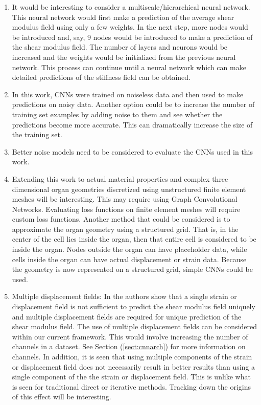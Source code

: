 \documentclass[12pt]{article}
\begin{document}
\begin{enumerate}
\item{It would be interesting to consider a multiscale/hierarchical neural network. This neural network would first make a prediction of the average shear modulus field using only a few weights. In the next step, more nodes would be introduced and, say, 9 nodes would be introduced to make a prediction of the shear modulus field. The number of layers and neurons would be increased and the weights would be initialized from the previous neural network. This process can continue until a neural network which can make detailed predictions of the stiffness field can be obtained.}
\item{In this work, CNNs were trained on noiseless data and then used to make predictions on noisy data. Another option could be to increase the number of training set examples by adding noise to them and see whether the predictions become more accurate. This can dramatically increase the size of the training set.}
\item{Better noise models need to be considered to evaluate the CNNs used in this work.}
\item{Extending this work to actual material properties and complex three dimensional organ geometries discretized using unstructured finite element meshes will be interesting. This may require using Graph Convolutional Networks. Evaluating loss functions on finite element meshes will require custom loss functions. Another method that could be considered is to approximate the organ geometry using a structured grid. That is, in the center of the cell lies inside the organ, then that entire cell is considered to be inside the organ. Nodes outside the organ can have placeholder data, while cells inside the organ can have actual displacement or strain data. Because the geometry is now represented on a structured grid, simple CNNs could be used.}
\item{Multiple displacement fields: In \cite{paper:barbonegokhale,paper:barbonebamber} the authors show that a single strain or displacement field is not sufficient to predict the shear modulus field uniquely and multiple displacement fields are required for unique prediction of the shear modulus field. The use of multiple displacement fields can be considered within our current framework. This would involve increasing the number of channels in a dataset. See Section (\ref{sect:cnnarch}) for more information on channels. In addition, it is seen that using multiple components of the strain or displacement field does not necessarily result in better results than using a single component of the the strain or displacement field. This is unlike what is seen for traditional direct or iterative methods. Tracking down the origins of this effect will be interesting.} 

\end{enumerate}
\end{document}
